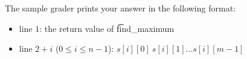 The sample grader prints your answer in the following format:
\begin{itemize}
\item line $1$: the return value of \t{find\_maximum}
\item line $2+i$ ($0\leq i\leq n-1$): $s[i][0]\ s[i][1]\ldots s[i][m-1]$
\end{itemize}
